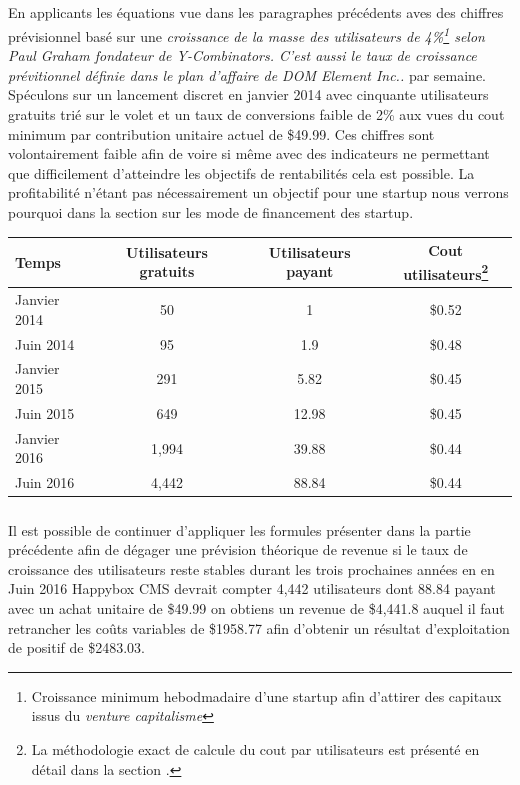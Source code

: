 \documentclass[11pt, a4paper ]{article}
\begin{document}
\begin{spacing}{1.5}
\begin{center}
\begin{tabular}{|l|l|l|l|}
	\end{tabular}
\end{center}
\subparagraph{}
En applicants les équations vue dans les paragraphes précédents aves des chiffres prévisionnel basé sur une \emph{croissance de la masse des utilisateurs de 4\%\footnote{Croissance minimum hebodmadaire d'une startup afin d'attirer des capitaux issus du \emph{venture capitalisme}} selon Paul Graham fondateur de Y-Combinators. C'est aussi le taux de croissance prévitionnel définie dans le plan d'affaire de DOM Element Inc..} par semaine.
Spéculons sur un lancement discret en janvier 2014 avec cinquante utilisateurs gratuits trié sur le volet et un taux de conversions faible de 2\% aux vues du cout minimum par contribution unitaire actuel de \$49.99. Ces chiffres sont volontairement faible afin de voire si même avec des indicateurs ne permettant que difficilement d'atteindre les objectifs de rentabilités cela est possible. La profitabilité n'étant pas nécessairement un objectif pour une startup nous verrons pourquoi dans la section sur les mode de financement des startup.



	\begin{tabular}{|l||c|c|c|}
		Temps & Utilisateurs gratuits & Utilisateurs payant & Cout utilisateurs\footnote{La méthodologie exact de calcule du cout par utilisateurs est présenté en détail dans la section .}\\ %
		\hline
		Janvier 2014 & 50 & 1 & \$0.52 \\
		Juin 2014 & 95 & 1.9 & \$0.48 \\
		Janvier 2015 & 291 & 5.82 & \$0.45 \\
		Juin 2015 & 649 & 12.98 & \$0.45 \\
		Janvier 2016 & 1,994 & 39.88 & \$0.44 \\
		Juin 2016 & 4,442 & 88.84 & \$0.44 \\
	\end{tabular}
	
\subparagraph{}
Il est possible de continuer d'appliquer les formules présenter dans la partie précédente afin de dégager une prévision théorique de revenue si le taux de croissance des utilisateurs reste stables durant les trois prochaines années en en Juin 2016 Happybox CMS devrait compter 4,442 utilisateurs dont 88.84 payant avec un achat unitaire de \$49.99 on obtiens un revenue de \$4,441.8 auquel il faut retrancher les coûts variables de \$1958.77 afin d'obtenir un résultat d'exploitation de positif de \$2483.03.


\end{spacing}
\end{document}
